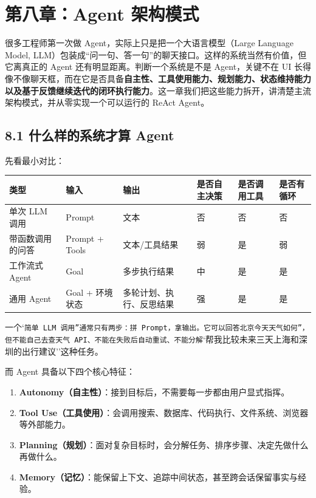 \chapter{第八章：Agent 架构模式}

很多工程师第一次做 Agent，实际上只是把一个大语言模型（Large Language Model, LLM）包装成``问一句、答一句''的聊天接口。这样的系统当然有价值，但它离真正的 Agent 还有明显距离。判断一个系统是不是 Agent，关键不在 UI 长得像不像聊天框，而在它是否具备\textbf{自主性、工具使用能力、规划能力、状态维持能力以及基于反馈继续迭代的闭环执行能力}。这一章我们把这些能力拆开，讲清楚主流架构模式，并从零实现一个可以运行的 ReAct Agent。


\section{8.1 什么样的系统才算 Agent}

先看最小对比：


\begingroup
\scriptsize
\setlength{\tabcolsep}{3pt}
\begin{longtable}{|p{}|p{}|p{}|p{}|p{}|p{}|}
\hline
类型 & 输入 & 输出 & 是否自主决策 & 是否调用工具 & 是否有循环 \\ \hline
单次 LLM 调用 & Prompt & 文本 & 否 & 否 & 否 \\ \hline
带函数调用的问答 & Prompt + Tools & 文本/工具结果 & 弱 & 是 & 弱 \\ \hline
工作流式 Agent & Goal & 多步执行结果 & 中 & 是 & 是 \\ \hline
通用 Agent & Goal + 环境状态 & 多轮计划、执行、反思结果 & 强 & 是 & 是 \\ \hline
\end{longtable}
\endgroup

一个`\texttt{简单 LLM 调用''通常只有两步：拼 Prompt，拿输出。它可以回答}\texttt{北京今天天气如何''，但不能自己去查天气 API、不能在失败后自动重试、不能分解}`帮我比较未来三天上海和深圳的出行建议''这种任务。


而 Agent 具备以下四个核心特征：


\begin{enumerate}[leftmargin=2em]
\item \textbf{Autonomy（自主性）}：接到目标后，不需要每一步都由用户显式指挥。
\item \textbf{Tool Use（工具使用）}：会调用搜索、数据库、代码执行、文件系统、浏览器等外部能力。
\item \textbf{Planning（规划）}：面对复杂目标时，会分解任务、排序步骤、决定先做什么再做什么。
\item \textbf{Memory（记忆）}：能保留上下文、追踪中间状态，甚至跨会话保留事实与经验。
\end{enumerate}

